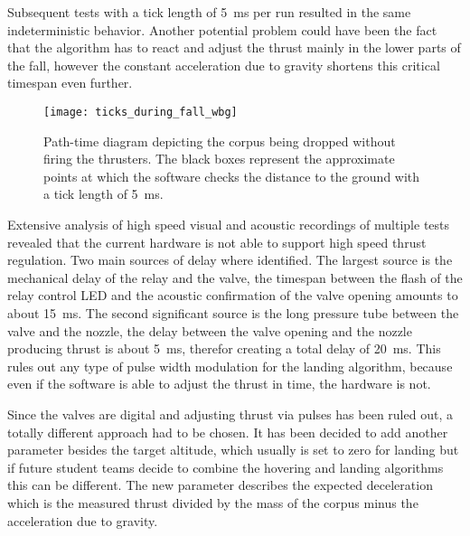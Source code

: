 Subsequent tests with a tick length of \SI{5}{\milli\second} per run resulted in the same indeterministic behavior. Another potential problem could have been the fact that the algorithm has to react and adjust the thrust mainly in the lower parts of the fall, however the constant acceleration due to gravity shortens this critical timespan even further. 

\begin{figure}[H]
\centering

\texttt{[image: ticks\_during\_fall\_wbg]}

\caption{Path-time diagram depicting the corpus being dropped without firing the thrusters. The black boxes represent the approximate points at which the software checks the distance to the ground with a tick length of \SI{5}{\milli\second}.}
\end{figure}


Extensive analysis of high speed visual and acoustic recordings of multiple tests revealed that the current hardware is not able to support high speed thrust regulation. Two main sources of delay where identified. The largest source is the mechanical delay of the relay and the valve, the timespan between the flash of the relay control LED and the acoustic confirmation of the valve opening amounts to about \SI{15}{\milli\second}. The second significant source is the long pressure tube between the valve and the nozzle, the delay between the valve opening and the nozzle producing thrust is about \SI{5}{\milli\second}, therefor creating a total delay of \SI{20}{\milli\second}. This rules out any type of pulse width modulation for the landing algorithm, because even if the software is able to adjust the thrust in time, the hardware is not.


Since the valves are digital and adjusting thrust via pulses has been ruled out, a totally different approach had to be chosen. It has been decided to add another parameter besides the target altitude, which usually is set to zero for landing but if future student teams decide to combine the hovering and  landing algorithms this can be different. The new parameter describes the expected deceleration which is the measured thrust divided by the mass of the corpus minus the acceleration due to gravity.

